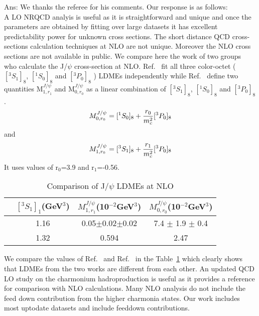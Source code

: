 \documentclass[aps,prc,preprint,superscriptaddress,showpacs,showkeys,amsmath]{revtex4-1}
\begin{document}
{\color{blue}
Ans: We thanks the referee for his comments. Our response is as follows:\\
  A LO NRQCD analyis is useful as it is straightforward and unique and once
the parameters are obtained by fitting over large datasets it has excellent 
predictability power for unknown cross sections.
 The short distance QCD cross-sections calculation techniques at NLO are not unique. 
Moreover the NLO cross sections are not available in public. 
 We compare here the work of two groups ~\cite{Butenschoen:2010rq,Ma:2010jj} who 
calculate the J/$\psi$ cross-section at NLO. Ref.~\cite{Butenschoen:2010rq} fit 
all three color-octet ($[^3S_1]_{8}$, $[^1S_0]_{8}$ and $[^3P_0]_{8}$ ) LDMEs independently 
while Ref.~\cite{Ma:2010jj} define two quantities M$^{J/\psi}_{1,r_{1}}$  and  M$^{J/\psi}_{0,r_{0}}$
as a linear combination of $[^3S_1]_{8}$, $[^1S_0]_{8}$ and $[^3P_0]_{8}$.
\begin{equation}
M^{J/\psi}_{0,r_{0}} = [^1S_0]_{8}  + \frac{r_{0}}{m_{c}^{2}}[^3P_0]_{8}\\ \nonumber
\end{equation}
and
\begin{equation}
M^{J/\psi}_{1,r_{0}} = [^3S_1]_{8}  + \frac{r_{1}}{m_{c}^{2}}[^3P_0]_{8}\\ \nonumber
\end{equation}
It uses values of r$_{0}$=3.9 and r$_{1}$=-0.56. 
\begin{table}[h]
\caption{Comparison of J/$\psi$ LDMEs at NLO}
\begin{tabular}{|l|c|c|c|}
\hline            
                             &$[^3S_1]_{1}$(GeV$^3$)                     &$M^{J/\psi}_{1,r_{1}}$(10$^{-2}$GeV$^3$)    &$M^{J/\psi}_{0,r_{0}}$(10$^{-2}$GeV$^3$)  \\        
\hline
\cite{Ma:2010jj}             &1.16                                     &0.05$\pm$0.02$\pm$0.02              &7.4 $\pm$ 1.9 $\pm$ 0.4 \\
\cite{Butenschoen:2010rq}    &1.32                                     &0.594                               &2.47 \\
\hline
\end{tabular}
\label{table:LDMEJPsiNLO_I}
\end{table}
We compare the values of Ref.~\cite{Butenschoen:2010rq} and Ref.~\cite{Ma:2010jj} in 
the Table~\ref{table:LDMEJPsiNLO_I} which clearly shows that LDMEs from the two works 
are different from each other. 
 An updated QCD LO study on the charmonium hadroproduction is useful as it
provides a reference for comparison with NLO calculations.
 Many NLO analysis do not include the feed down contribution from the higher charmonia 
states. Our work includes most uptodate datasets and include feeddown contributions.
}
 \\
\end{document}
